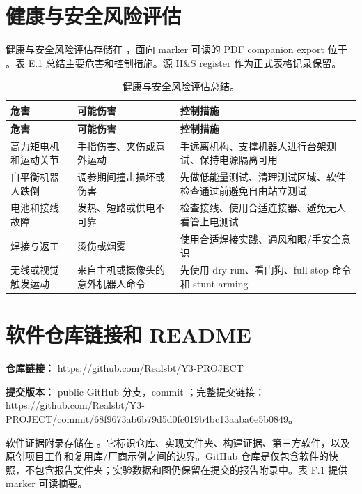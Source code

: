 \documentclass[12pt, a4paper]{article}
\begin{document}
\section{健康与安全风险评估}
健康与安全风险评估存储在 ，面向 marker 可读的 PDF companion export 位于 。表 E.1 总结主要危害和控制措施。源 H\&S register 作为正式表格记录保留。

\begingroup
\singlespacing
\small
\setlength{\tabcolsep}{2pt}
\renewcommand{\arraystretch}{1.15}
\begin{longtable}{>{\RaggedRight\arraybackslash}p{}>{\RaggedRight\arraybackslash}p{}>{\RaggedRight\arraybackslash}p{}}
\caption{健康与安全风险评估总结。}\\
\toprule
\textbf{危害} & \textbf{可能伤害} & \textbf{控制措施} \\
\midrule
\endfirsthead
\toprule
\textbf{危害} & \textbf{可能伤害} & \textbf{控制措施} \\
\midrule
\endhead
高力矩电机和运动关节 & 手指伤害、夹伤或意外运动 & 手远离机构、支撑机器人进行台架测试、保持电源隔离可用 \\
自平衡机器人跌倒 & 调参期间撞击损坏或伤害 & 先做低能量测试、清理测试区域、软件检查通过前避免自由站立测试 \\
电池和接线故障 & 发热、短路或供电不可靠 & 检查接线、使用合适连接器、避免无人看管上电测试 \\
焊接与返工 & 烫伤或烟雾 & 使用合适焊接实践、通风和眼/手安全意识 \\
无线或视觉触发运动 & 来自主机或摄像头的意外机器人命令 & 先使用 dry-run、看门狗、full-stop 命令和 stunt arming \\
\bottomrule
\end{longtable}
\endgroup

\clearpage
\section{软件仓库链接和 README}
\textbf{仓库链接：} \url{https://github.com/Realsbt/Y3-PROJECT}

\textbf{提交版本：} public GitHub \texttt{} 分支，commit \texttt{}；完整提交链接：\url{https://github.com/Realsbt/Y3-PROJECT/commit/68f9673ab6b79d5d0fc019b4bc13aaba6e5b0849}。

软件证据附录存储在 。它标识仓库、实现文件夹、构建证据、第三方软件，以及原创项目工作和复用库/厂商示例之间的边界。GitHub 仓库是仅包含软件的快照，不包含报告文件夹；实验数据和图仍保留在提交的报告附录中。表 F.1 提供 marker 可读摘要。
\end{document}
